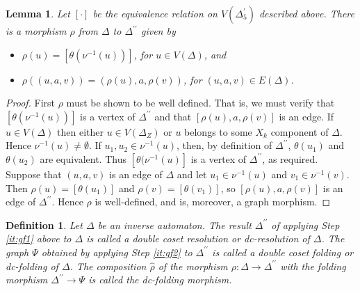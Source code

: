 \documentclass[a4paper,12pt]{article}
\newcommand{\D}{\Delta }
\renewcommand{\S}{\Sigma }
\newcommand{\nul}{\emptyset }
\newtheorem{lemma}[theorem]{Lemma}
\newtheorem{definition}[theorem]{Definition}
\numberwithin{equation}{section}
\numberwithin{figure}{section}
\newcommand{\maps}{\rightarrow}
\begin{document}
\begin{lemma}\label{lem:resol-quot}
Let $[\cdot]$ be the equivalence relation on $V(\D^\prime_5)$
described above. There is a morphism $\rho$ from  $\D$ to
$\D^{\prime\prime}$ given by 
\begin{itemize}
\item 
$\rho(u)=[\theta(\nu^{-1}(u))]$, for
$u\in V(\D)$, and 
\item 
$\rho((u,a,v))=(\rho(u),a,\rho(v))$, for $(u,a,v)\in  E(\D)$. 
\end{itemize}
\end{lemma}
\begin{proof}
First $\rho$ must be shown to be well defined. 
That is, we must verify that $[\theta(\nu^{-1}(u))]$ is a vertex of
$\D^{\prime\prime}$ and that $[\rho(u),a,\rho(v)]$ is an edge. 
If $u \in V(\D)$  
then either $u\in V(\D_Z)$ or  $u$ belongs to
some $X_k$ component of $\D$. Hence
 $\nu^{-1}(u)\neq \nul$. If $u_1, u_2\in \nu^{-1}(u)$, then, 
by definition of
$\D^{\prime\prime}$, $\theta(u_1)$ and $\theta(u_2)$ are equivalent.
Thus $[\theta(\nu^{-1}(u)]$ is a vertex of $\D^{\prime\prime}$,
as required. 
 Suppose that $(u,a,v)$ is an edge
of $\D$ and let $u_1\in \nu^{-1}(u)$ and $v_1\in \nu^{-1}(v)$. Then
$\rho(u)=[\theta(u_1)]$ and $\rho(v)=[\theta(v_1)]$, so 
$[\rho(u), a, \rho(v)]$ is an edge of $\D^{\prime\prime}$. 
Hence $\rho$ is well-defined, and is, moreover, a graph morphism.
\end{proof}


\begin{definition}
Let $\D$ be an inverse automaton.
 The result $\D^{\prime\prime}$ of applying Step \ref{it:gf1}
above to $\D$ is called a \emph{double coset resolution} or
\emph{dc-resolution} of $\D$. The graph $\Psi$ obtained by applying
Step \ref{it:gf2} to $\D^{\prime\prime}$ is called a \emph{double
coset folding} or \emph{dc-folding} of $\D$.  The composition $\hat\rho$ of
the  morphism
$\rho:\D\maps \D^{\prime\prime}$ with the folding morphism $\D^{\prime\prime}\maps
\Psi$ is called the \emph{dc-folding morphism}.
\end{definition}
\end{document}
